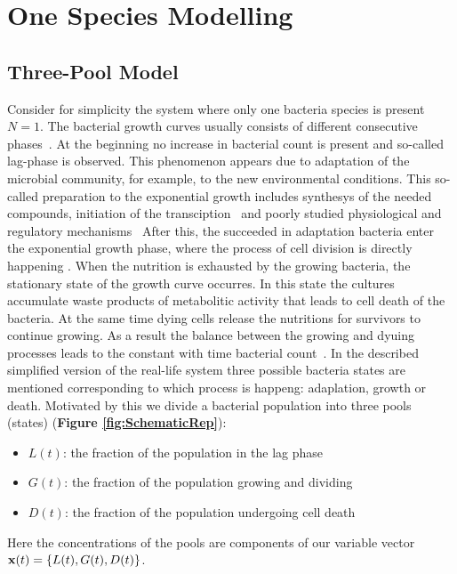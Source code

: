 \documentclass[10pt,A4paper]{article}
\begin{document}
\newpage

\section{One Species Modelling}
\subsection{Three-Pool Model}

Consider for simplicity the system where only one bacteria species is present $N=1$.
The bacterial growth curves usually consists of different consecutive phases~\cite{buchanan_when_1997}.
At the beginning no increase in bacterial count is present and so-called lag-phase is observed.
This phenomenon appears due to adaptation of the microbial community, for example, to the new environmental conditions.
This so-called preparation to the exponential growth includes synthesys of the needed compounds, initiation of the transciption~\cite{rolfe_lag_2012} and poorly studied physiological and regulatory mechanisms~\cite{monod_growth_1949,}
After this, the succeeded in adaptation bacteria enter the exponential growth phase, where the process of cell division is directly happening .
When the nutrition is exhausted by the growing bacteria, the stationary state of the growth curve occurres.
In this state the cultures accumulate waste products of metabolitic activity that leads to cell death of the bacteria.
At the same time dying cells release the nutritions for survivors to continue growing.
As a result the balance between the growing and dyuing processes leads to the constant with time bacterial count~\cite{navarro_llorens_stationary_2010}.
In the described simplified version of the real-life system three possible bacteria states are mentioned corresponding to which process is happeng: adaplation, growth or death.
Motivated by this we divide a bacterial population into three pools (states) (\textbf{Figure \ref{fig:SchematicRep}}): 
\begin{itemize}
\item $L(t)$: the fraction of the population in the lag phase
\item $G(t)$: the fraction of the population growing and dividing
\item $D(t)$: the fraction of the population undergoing cell death
\end{itemize}
Here the concentrations of the pools are components of our variable vector $\mathbf{x} (t) =\{L(t), G(t), D(t)\}$.
\end{document}
